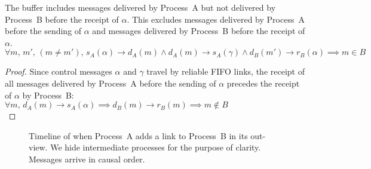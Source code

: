 \begin{lemma}
  The buffer includes messages delivered by Process~A but not delivered by
  Process~B before the receipt of $\alpha$. This excludes messages delivered by
  Process~A before the sending of $\alpha$ and messages delivered by Process~B
  before the receipt of $\alpha$.\\
  $\forall m,\,m',\,(m\neq m'),\,
  s_A(\alpha) \rightarrow d_A(m) \wedge
  d_A(m) \rightarrow s_A(\gamma) \wedge
  d_B(m') \rightarrow r_B(\alpha) \implies m \in B$
\end{lemma}

\begin{proof}
  Since control messages $\alpha$ and $\gamma$ travel by reliable FIFO links,
  the receipt of all messages delivered by Process~A before the sending of
  $\alpha$ precedes the receipt of $\alpha$ by Process~B:\\
  $\forall m,\, d_A(m) \rightarrow s_A(\alpha) \implies d_B(m) \rightarrow
  r_B(m) \implies m \not\in B$\\
\end{proof}


\begin{figure*}
  \begin{center}
    
    \caption{\label{fig:timeline}Timeline of \RPCBROADCAST when Process~A adds a
      link to Process~B in its out-view. We hide intermediate processes for the
      purpose of clarity. Messages arrive in causal order.}
  \end{center}
\end{figure*}


